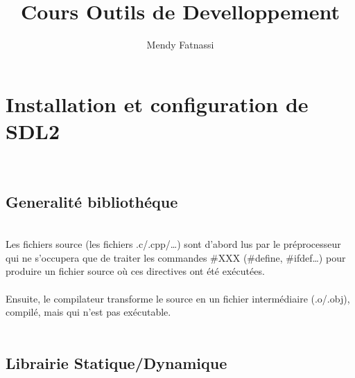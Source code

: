 \documentclass[a4paper,12pt,openany]{book}
\author{Mendy Fatnassi}
\title{Cours Outils de Develloppement}
\begin{document}
\chapter{Installation et configuration de SDL2}
\\
\section{Generalité bibliothéque}
\\
Les fichiers source (les fichiers .c/.cpp/…) sont d'abord lus par le préprocesseur qui ne s'occupera que de traiter les commandes #XXX (#define, #ifdef…) pour produire un fichier source où ces directives ont été exécutées.\\
\\
Ensuite, le compilateur transforme le source en un fichier intermédiaire (.o/.obj), compilé, mais qui n'est pas exécutable.\\
\\


\section{Librairie Statique/Dynamique}
\end{document}
